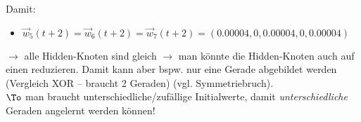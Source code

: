 Damit:
\begin{itemize}
\item $\vec{w}_5(t+2)=\vec{w}_6(t+2)=\vec{w}_7(t+2)=(0.00004, 0, 0.00004, 0, 0.00004)$
\end{itemize}
$\to$ alle Hidden-Knoten sind gleich $\to$ man könnte die Hidden-Knoten auch auf einen reduzieren. Damit kann aber bspw. nur eine Gerade abgebildet werden (Vergleich XOR -- braucht 2 Geraden) (vgl. Symmetriebruch).\\
$\To$ man braucht unterschiedliche/zufällige Initialwerte, damit \emph{unterschiedliche} Geraden angelernt werden können!

